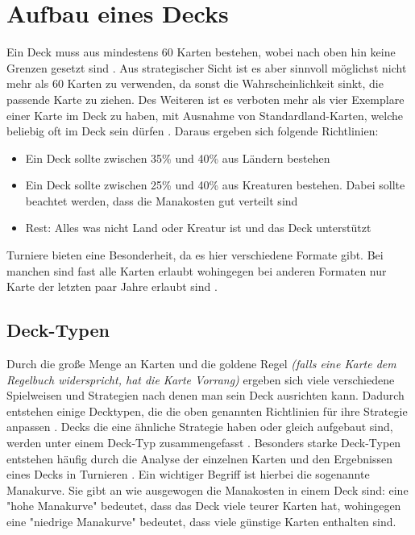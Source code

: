 \section{Aufbau eines Decks}\label{ch:grundlagen:deck}
Ein Deck muss aus mindestens 60 Karten bestehen, wobei nach oben hin keine Grenzen gesetzt sind \cite{rulebook:2013}. Aus strategischer Sicht ist es aber sinnvoll möglichst nicht mehr als 60 Karten zu verwenden, da sonst die Wahrscheinlichkeit sinkt, die passende Karte zu ziehen. Des Weiteren ist es verboten mehr als vier Exemplare einer Karte im Deck zu haben, mit Ausnahme von Standardland-Karten, welche beliebig oft im Deck sein dürfen \cite{rulebook:2013}. Daraus ergeben sich folgende Richtlinien: 
\begin{itemize}
    \item Ein Deck sollte zwischen 35\% und 40\% aus Ländern bestehen  \cite{wotc:gameplay}
    \item Ein Deck sollte zwischen 25\% und 40\% aus Kreaturen bestehen. Dabei sollte beachtet werden, dass die Manakosten gut verteilt sind  \cite{wotc:gameplay}
    \item Rest: Alles was nicht Land oder Kreatur ist und das Deck unterstützt \cite{wotc:gameplay}
\end{itemize}
Turniere bieten eine Besonderheit, da es hier verschiedene Formate gibt. Bei manchen sind fast alle Karten erlaubt wohingegen bei anderen Formaten nur Karte der letzten paar Jahre erlaubt sind \cite{wotc:gameplay}.


\subsection{Deck-Typen}
Durch die große Menge an Karten und die goldene Regel \emph{(falls eine Karte dem Regelbuch widerspricht, hat die Karte Vorrang)} ergeben sich viele verschiedene Spielweisen und Strategien nach denen man sein Deck ausrichten kann. Dadurch entstehen einige Decktypen, die die oben genannten Richtlinien für ihre Strategie anpassen \cite{wotc:gameplay}. Decks die eine ähnliche Strategie haben oder gleich aufgebaut sind, werden unter einem Deck-Typ zusammengefasst \cite{haumagic}. Besonders starke Deck-Typen entstehen häufig durch die Analyse der einzelnen Karten und den Ergebnissen eines Decks in Turnieren \cite{haumagic}. Ein wichtiger Begriff ist hierbei die sogenannte Manakurve. Sie gibt an wie ausgewogen die Manakosten in einem Deck sind: eine "hohe Manakurve" bedeutet, dass das Deck viele teurer Karten hat, wohingegen eine "niedrige Manakurve" bedeutet, dass viele günstige Karten enthalten sind. 

